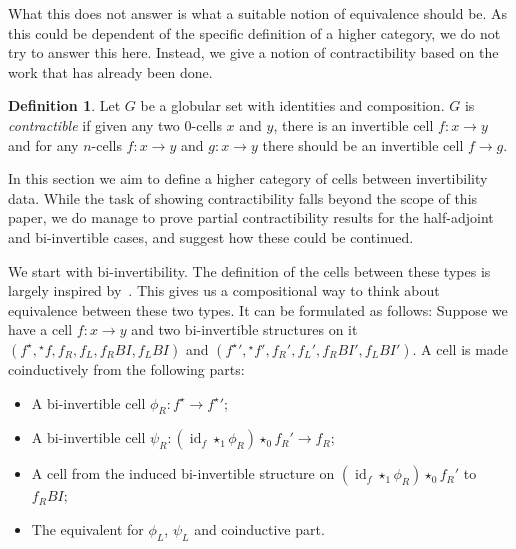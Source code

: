\documentclass{article}
\theoremstyle{definition}
\newtheorem{definition}{Definition}
\theoremstyle{remark}
\DeclareMathOperator{\id}{id}
\newcommand{\linv}[1]{{}^\star\!#1}
\newcommand{\rinv}[1]{#1^\star}
\newcommand{\comp}{\star}
\begin{document}
What this does not answer is what a suitable notion of equivalence should be. As this could be dependent of the specific definition of a higher category, we do not try to answer this here. Instead, we give a notion of contractibility based on the work that has already been done.

\begin{definition}
  Let \(G\) be a globular set with identities and composition. \(G\) is \emph{contractible} if given any two \(0\)-cells \(x\) and \(y\), there is an invertible cell \(f : x \to y\) and for any \(n\)-cells \(f : x \to y\) and \(g : x \to y\) there should be an invertible cell \(f \to g\).
\end{definition}

In this section we aim to define a higher category of cells between invertibility data. While the task of showing contractibility falls beyond the scope of this paper, we do manage to prove partial contractibility results for the half-adjoint and bi-invertible cases, and suggest how these could be continued.

We start with bi-invertibility. The definition of the cells between these types is largely inspired by~\cite[Lemma 4.2.5]{hottbook}. This gives us a compositional way to think about equivalence between these two types. It can be formulated as follows: Suppose we have a cell \(f : x \to y\) and two bi-invertible structures on it \((\rinv f, \linv f, f_R, f_L, f_R{}BI, f_L{}BI)\) and \((\rinv f{}' , \linv f{}', f_R', f_L', f_R{}BI', f_L{}BI')\). A cell is made coinductively from the following parts:
\begin{itemize}
\item A bi-invertible cell \(\phi_R : \rinv f \to \rinv f{}'\);
\item A bi-invertible cell \(\psi_R : (\id_f \comp_1 \phi_R) \comp_0 f_R' \to f_R\);
\item A cell from the induced bi-invertible structure on \((\id_f \comp_1 \phi_R) \comp_0 f_R'\) to \(f_R{}BI\);
\item The equivalent for \(\phi_L\), \(\psi_L\) and coinductive part.
\end{itemize}
\end{document}
